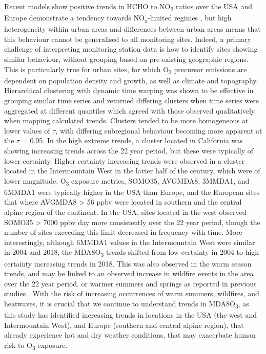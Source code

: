 \documentclass[journal abbreviation, manuscript]{copernicus}
\begin{document}
Recent models show positive trends in HCHO to NO\textsubscript{2} ratios over the USA and Europe demonstrate a tendency towards NO\textsubscript{x}-limited regimes \citep{Fadnavis_2025}, but high heterogeneity within urban areas and differences between urban areas means that this behaviour cannot be generalised to all monitoring sites. Indeed, a primary challenge of interpreting monitoring station data is how to identify sites showing similar behaviour, without grouping based on pre-existing geographic regions. This is particularly true for urban sites, for which O\textsubscript{3} precursor emissions are  dependent on population density and growth, as well as climate and topography. Hierarchical clustering with dynamic time warping was shown to be effective in grouping similar time series and returned differing clusters when time series were aggregated at different quantiles which agreed with those observed qualitatively when mapping calculated trends. Clusters tended to be more homogeneous at lower values of $\tau$, with differing subregional behaviour becoming more apparent at the $\tau$ = 0.95. In the high extreme trends, a cluster located in California was showing increasing trends across the 22 year period, but these were typically of lower certainty. Higher certainty increasing trends were observed in a cluster located in the Intermountain West in the latter half of the century, which were of lower magnitude. O\textsubscript{3} exposure metrics, SOMO35, AVGMDA8, 3MMDA1, and 6MMDA1 were typically higher in the USA than Europe, and the European sites that where AVGMDA8 > 56 ppbv were located in southern and the central alpine region of the continent. In the USA, sites located in the west observed SOMO35 > 7000 ppbv day more consistently over the 22 year period, though the number of sites exceeding this limit decreased in frequency with time. More interestingly, although 6MMDA1 values in the Intermountain West were similar in 2004 and 2018, the MDA8O\textsubscript{3} trends shifted from low certainty in 2004 to high certainty increasing trends in 2018. This was also observed in the warm season trends, and may be linked to an observed increase in wildfire events in the area over the 22 year period, or warmer summers and springs as reported in previous studies \citep{Lin2017, Li2021, Peterson2021, Iglesias2022}. With the risk of increasing occurrences of warm summers, wildfires, and heatwaves, it is crucial that we continue to understand trends in MDA8O\textsubscript{3}, as this study has identified increasing trends in locations in the USA (the west and Intermountain West), and Europe (southern and central alpine region), that already experience hot and dry weather conditions, that may exacerbate human risk to O\textsubscript{3} exposure. 
\end{document}
